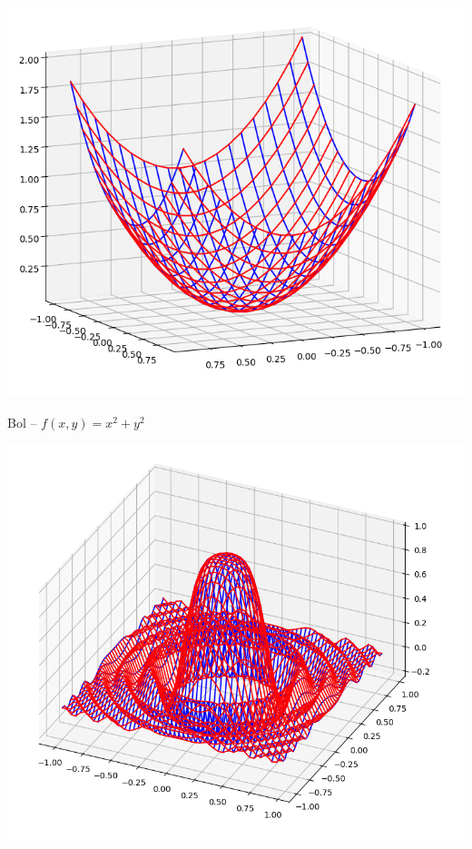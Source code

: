 \documentclass[11pt,class=report,crop=false]{standalone}
\begin{document}

\begin{activite}[Surfaces]


\begin{center}
	\begin{minipage}{0.4\textwidth}
		\begin{center}
			\includegraphics[scale=\myscale,scale=0.3]{ecran-surface-1}
			
			Bol -- $f(x,y) = x^2+y^2$
		\end{center}
	\end{minipage}\quad
	\begin{minipage}{0.4\textwidth}
		\begin{center}
			\includegraphics[scale=\myscale,scale=0.3]{ecran-surface-2}
			

\end{center}
\end{minipage}
\end{center}
\end{activite}
\end{document}
